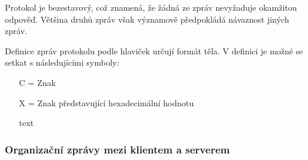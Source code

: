 \documentclass[12pt,a4paper]{article}
\begin{document}
Protokol je bezestavový, což znamená, že žádná ze zpráv nevyžaduje okamžitou odpověď. Většina druhů zpráv však významově předpokládá návaznost jiných zpráv.

Definice zpráv protokolu podle hlaviček určují formát těla. V definici je možné se setkat s následujícími symboly:
\begin{itemize}
\item[C] = Znak
\item[X] = Znak představující hexadecimální hodnotu
\item[text]
\end{itemize}

\subsubsection*{Organizační zprávy mezi klientem a serverem}
\end{document}
